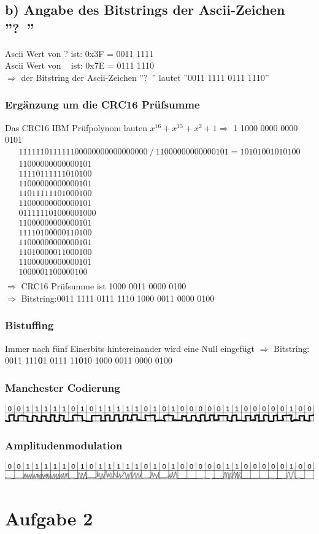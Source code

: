 \documentclass[numbers=noendperiod]{scrartcl}
\begin{document}
\subsection{b) Angabe des Bitstrings der Ascii-Zeichen ''?~''}
Ascii Wert von ? ist: 0x3F = 0011 1111 \\
Ascii Wert von ~ ist: 0x7E = 0111 1110 \\
\(\Rightarrow \) der Bitstring der Ascii-Zeichen ''?~'' lautet ''0011 1111 0111 1110''
\subsubsection*{Ergänzung um die CRC16 Prüfsumme}
Das CRC16 IBM Prüfpolynom lauten \(x^{16}+x^{15}+x^2 + 1 \Rightarrow \) 1 1000 0000 0000 0101 \\
  \begin{align*}
&11 1111 0111 1110 0000 0000 0000 0000 \ / \ 1 1000 0000 0000 0101 = 10101001010100&\\
&11 0000 0000 0000 101&\\
   &1111 0111 1110 1010 0&\\
   &1100 0000 0000 0010 1&\\
     &11 0111 1110 1000 100&\\
	 &11 0000 0000 0000 101&\\
		&0111 1110 1000 0010 00&\\
		 &110 0000 0000 0001 01&\\
		   &1 1110 1000 0011 0100&\\
		   &1 1000 0000 0000 0101&\\
		      &110 1000 0011 0001 00&\\
		      &110 0000 0000 0001 01&\\
		          &1000 0011 0000 0100&\\
		        \end{align*}
		        \(\Rightarrow\) CRC16 Prüfsumme ist 1000 0011 0000 0100\\
		        \(\Rightarrow\) Bitstring:0011 1111 0111 1110 1000 0011 0000 0100
\subsubsection*{Bistuffing}
Immer nach fünf Einerbits hintereinander wird eine Null eingefügt
 \(\Rightarrow\) Bitstring: 0011 111\textbf{0}1 0111 11\textbf{0}10 1000 0011 0000 0100
\subsubsection*{Manchester Codierung}
\includegraphics[width=1.0\textwidth]{manchester.png}
\subsubsection*{Amplitudenmodulation}
\includegraphics[width=1.0\textwidth]{amplitude.png}
\section*{Aufgabe 2}
\end{document}
